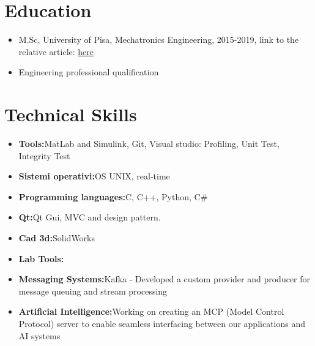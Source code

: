 \documentclass{article}
\begin{document}
 
\section{Education}

\begin{itemize}
\item M.Sc, University of Pisa, Mechatronics Engineering, 2015-2019, link to the relative article: \href{https://ieeexplore.ieee.org/document/10016730}{here}

\item Engineering professional qualification

\end{itemize}


\section{Technical Skills}

\begin{itemize}
\item \textbf{Tools:}MatLab and Simulink, Git, Visual studio: Profiling, Unit Test, Integrity Test
\item \textbf{Sistemi operativi:}OS UNIX, real-time
\item \textbf{Programming languages:}C, C++, Python, C\#
\item \textbf{Qt:}Qt Gui, MVC and design pattern.
\item \textbf{Cad 3d:}SolidWorks
\item \textbf{Lab Tools:}
\item \textbf{Messaging Systems:}Kafka - Developed a custom provider and producer for message queuing and stream processing
\item \textbf{Artificial Intelligence:}Working on creating an MCP (Model Control Protocol) server to enable seamless interfacing between our applications and AI systems
\end{itemize}

 
\end{document}
